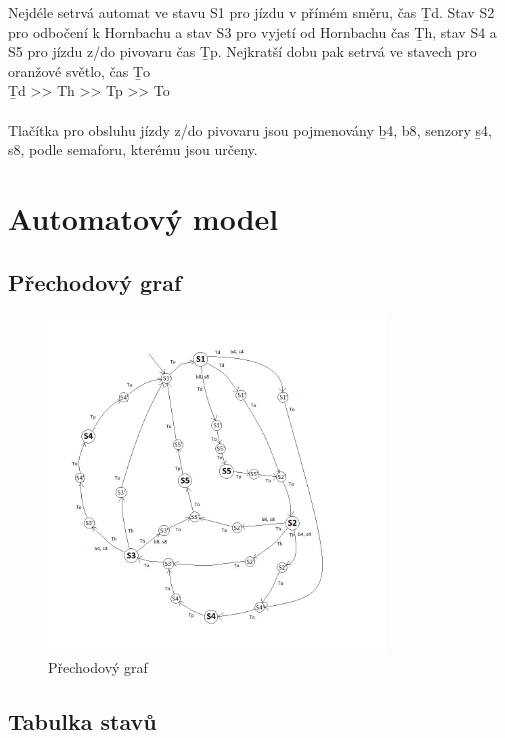 \documentclass[12pt, a4paper]{report}
\begin{document}
\noindent
Nejdéle setrvá automat ve stavu S1 pro jízdu v přímém směru, čas {\b Td}. Stav S2 pro odbočení k Hornbachu a stav S3 pro vyjetí od Hornbachu čas {\b Th}, stav S4 a S5 pro jízdu z/do pivovaru čas {\b Tp}. Nejkratší dobu pak setrvá ve stavech pro oranžové světlo, čas {\b To}\\
{\b Td >> Th >> Tp >> To}\\
\\
Tlačítka pro obsluhu jízdy z/do pivovaru jsou pojmenovány {\b b4, b8}, senzory {\b s4, s8}, podle semaforu, kterému jsou určeny.



\chapter{Automatový model}

\section{Přechodový graf}

\begin{figure}[!h]
	\centering
		\includegraphics[width=0.80\textwidth]{image/prechodovy_graf.jpg}
	\caption{Přechodový graf}
	\label{fig:prechodovy_graf}
\end{figure}


\clearpage

\section{Tabulka stavů}
\end{document}
